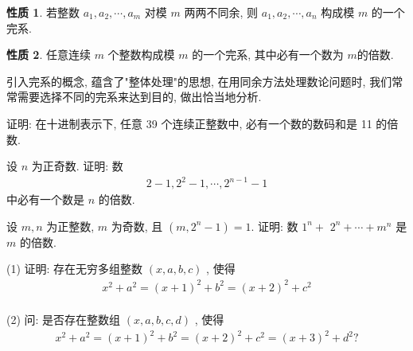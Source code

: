 \documentclass[aspectratio=169]{ctexbeamer}
\theoremstyle{definition}
\newtheorem{property}{性质}[section]
\begin{document}
\begin{frame}
\begin{property}
	若整数 $a_{1}, a_{2}, \cdots, a_{m}$ 对模 $m$ 两两不同余, 则 $a_{1}, a_{2}, \cdots, a_{n}$ 构成模 $m$ 的一个完系.
\end{property}

\begin{property}
	任意连续 $m$ 个整数构成模 $m$ 的一个完系, 其中必有一个数为 $m$的倍数.
\end{property}
引入完系的概念, 蕴含了"整体处理"的思想, 在用同余方法处理数论问题时, 我们常常需要选择不同的完系来达到目的, 做出恰当地分析.
\end{frame}

\begin{frame}[t]
\begin{example}
	证明: 在十进制表示下, 任意 39 个连续正整数中, 必有一个数的数码和是 11 的倍数.
\end{example}
\end{frame}

\begin{frame}[t]
\begin{example}
	设 $n$ 为正奇数. 证明: 数
	\begin{align*}
		2-1,2^{2}-1, \cdots, 2^{n-1}-1
	\end{align*}
	中必有一个数是 $n$ 的倍数.
\end{example}
\end{frame}

\begin{frame}[t]
\begin{example}
	设 $m ,  n$ 为正整数, $m$ 为奇数, 且 $\left(m, 2^{n}-1\right)=1$. 证明: 数 $1^{n}+$ $2^{n}+\cdots+m^{n}$ 是 $m$ 的倍数.
\end{example}
\end{frame}

\begin{frame}[t]
\begin{example}
	(1) 证明: 存在无穷多组整数 $(x, a, b, c)$ , 使得
	\begin{align*}
		x^{2}+a^{2}=(x+1)^{2}+b^{2}=(x+2)^{2}+c^{2}
	\end{align*}\\
	(2) 问: 是否存在整数组 $(x, a, b, c, d)$ , 使得
	\begin{align*}
		x^{2}+a^{2}=(x+1)^{2}+b^{2}=(x+2)^{2}+c^{2}=(x+3)^{2}+d^{2} ?
	\end{align*}
\end{example}
\end{frame}
\end{document}
